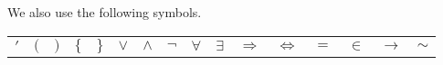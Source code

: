We also use the following symbols.
\begin{center}
\vspace{0.3cm}
\begin{tabular}{cccccccccccccccc}
$'$ & $($ & $)$ & $\{$ & $\}$ & $\lor$ & $\land$ & $\neg$ & $\forall$ & $\exists $ & $\Rightarrow$ & $\iff$ & $=$ & $\in$ & $\to$ & $\sim$\\
\end{tabular}
\vspace{0.1cm}

%   
\end{center}
